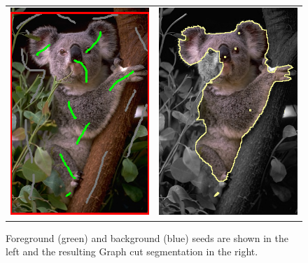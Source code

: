 \begin{figure}
\centering
\begin{tabular}{cc}
\includegraphics[scale=0.4]{figures/chapter9/segmentation/seeds.png} &
\includegraphics[scale=0.4]{figures/chapter9/segmentation/gc-seg.png}
\end{tabular}
\caption{Foreground (green) and background (blue) seeds are shown in the left and the resulting Graph cut segmentation in the right.}
\label{ch9:fig:grabcut-input-image-segmentation}
\end{figure}

